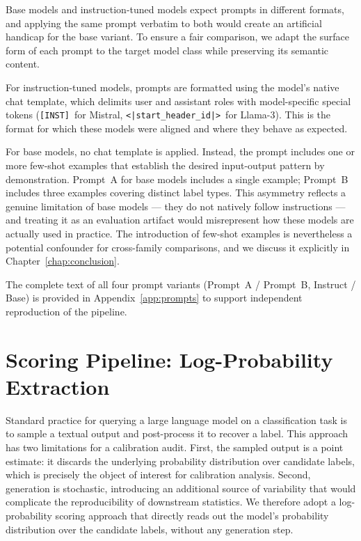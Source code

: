 Base models and instruction-tuned models expect prompts in different 
formats, and applying the same prompt verbatim to both would create an 
artificial handicap for the base variant. To ensure a fair comparison, 
we adapt the surface form of each prompt to the target model class while 
preserving its semantic content.

For instruction-tuned models, prompts are formatted using the model's 
native chat template, which delimits user and assistant roles with 
model-specific special tokens (\texttt{[INST]}~for Mistral, 
\texttt{<|start\_header\_id|>}~for Llama-3). This is the format for which 
these models were aligned and where they behave as expected.

For base models, no chat template is applied. Instead, the prompt includes 
one or more few-shot examples that establish the desired input-output 
pattern by demonstration. Prompt~A for base models includes a single 
example; Prompt~B includes three examples covering distinct label types. 
This asymmetry reflects a genuine limitation of base models --- they do 
not natively follow instructions --- and treating it as an evaluation 
artifact would misrepresent how these models are actually used in 
practice. The introduction of few-shot examples is nevertheless a 
potential confounder for cross-family comparisons, and we discuss it 
explicitly in Chapter~\ref{chap:conclusion}.

The complete text of all four prompt variants (Prompt~A / Prompt~B, 
Instruct / Base) is provided in Appendix~\ref{app:prompts} to support 
independent reproduction of the pipeline.

\section{Scoring Pipeline: Log-Probability Extraction}
\label{sec:met-scoring}

Standard practice for querying a large language model on a classification 
task is to sample a textual output and post-process it to recover a label. 
This approach has two limitations for a calibration audit. First, the 
sampled output is a point estimate: it discards the underlying probability 
distribution over candidate labels, which is precisely the object of 
interest for calibration analysis. Second, generation is stochastic, 
introducing an additional source of variability that would complicate the 
reproducibility of downstream statistics. We therefore adopt a 
log-probability scoring approach that directly reads out the model's 
probability distribution over the candidate labels, without any generation 
step.

